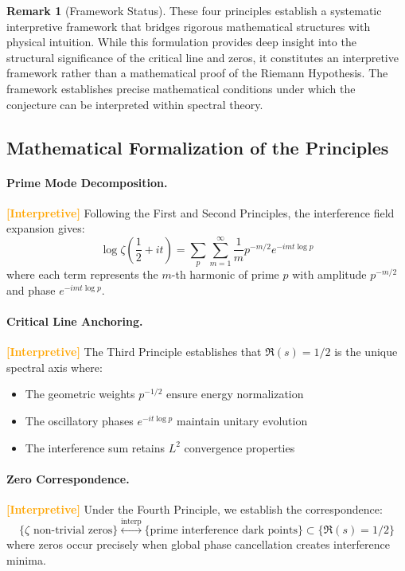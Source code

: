 \documentclass[12pt]{article}
\theoremstyle{plain}
\theoremstyle{definition}
\newtheorem{remark}[theorem]{Remark}
\newcommand{\statusinterp}{\textcolor{orange}{\textbf{[Interpretive]}}}
\begin{document}
\begin{remark}[Framework Status]
These four principles establish a systematic interpretive framework that bridges rigorous mathematical structures with physical intuition. While this formulation provides deep insight into the structural significance of the critical line and zeros, it constitutes an interpretive framework rather than a mathematical proof of the Riemann Hypothesis. The framework establishes precise mathematical conditions under which the conjecture can be interpreted within spectral theory.
\end{remark}

\subsection{Mathematical Formalization of the Principles}

\paragraph{Prime Mode Decomposition.} \statusinterp
Following the First and Second Principles, the interference field expansion gives:
$$\log \zeta\left(\frac{1}{2}+it\right) = \sum_{p}\sum_{m=1}^{\infty} \frac{1}{m} p^{-m/2} e^{-imt\log p}$$
where each term represents the $m$-th harmonic of prime $p$ with amplitude $p^{-m/2}$ and phase $e^{-imt\log p}$.

\paragraph{Critical Line Anchoring.} \statusinterp
The Third Principle establishes that $\Re(s) = 1/2$ is the unique spectral axis where:
\begin{itemize}
\item The geometric weights $p^{-1/2}$ ensure energy normalization
\item The oscillatory phases $e^{-it\log p}$ maintain unitary evolution
\item The interference sum retains $L^2$ convergence properties
\end{itemize}

\paragraph{Zero Correspondence.} \statusinterp
Under the Fourth Principle, we establish the correspondence:
$$\{\text{$\zeta$ non-trivial zeros}\} \stackrel{\text{interp}}{\leftrightarrow} \{\text{prime interference dark points}\} \subset \{\Re(s) = 1/2\}$$
where zeros occur precisely when global phase cancellation creates interference minima.
\end{document}
